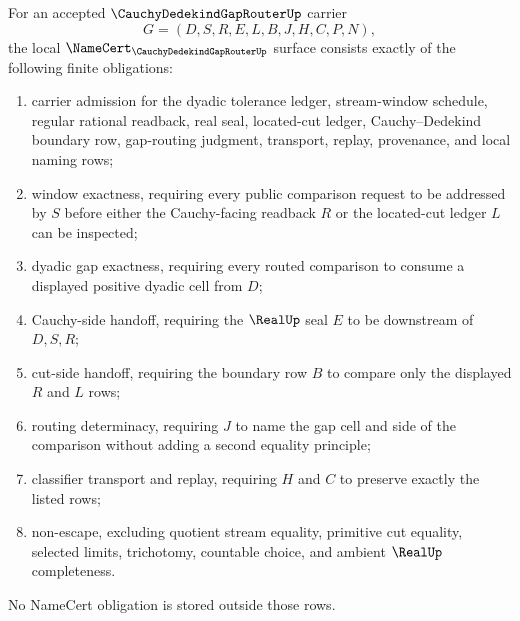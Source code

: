 \begin{theorem}\label{thm:cauchy-dedekind-gap-router-namecert-obligations}
For an accepted $\CauchyDedekindGapRouterUp$ carrier
$$
G=(D,S,R,E,L,B,J,H,C,P,N),
$$
the local $\NameCert_{\CauchyDedekindGapRouterUp}$ surface consists exactly of the following finite obligations:
\begin{enumerate}
\item carrier admission for the dyadic tolerance ledger, stream-window schedule, regular rational readback, real seal, located-cut ledger, Cauchy--Dedekind boundary row, gap-routing judgment, transport, replay, provenance, and local naming rows;
\item window exactness, requiring every public comparison request to be addressed by $S$ before either the Cauchy-facing readback $R$ or the located-cut ledger $L$ can be inspected;
\item dyadic gap exactness, requiring every routed comparison to consume a displayed positive dyadic cell from $D$;
\item Cauchy-side handoff, requiring the $\RealUp$ seal $E$ to be downstream of $D,S,R$;
\item cut-side handoff, requiring the boundary row $B$ to compare only the displayed $R$ and $L$ rows;
\item routing determinacy, requiring $J$ to name the gap cell and side of the comparison without adding a second equality principle;
\item classifier transport and replay, requiring $H$ and $C$ to preserve exactly the listed rows;
\item non-escape, excluding quotient stream equality, primitive cut equality, selected limits, trichotomy, countable choice, and ambient $\RealUp$ completeness.
\end{enumerate}
No NameCert obligation is stored outside those rows.
\end{theorem}
